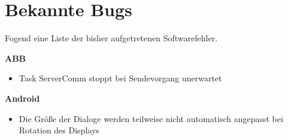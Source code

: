\section{Bekannte Bugs}
\label{sec:Bugs}
Fogend eine Liste der bisher aufgetretenen Softwarefehler.

\textbf{ABB}
\begin{itemize}
\item Task ServerComm stoppt bei Sendevorgang unerwartet
\end{itemize}

\textbf{Android}
\begin{itemize}
\item Die Größe der Dialoge werden teilweise nicht automatisch angepasst bei 
Rotation des Displays
\end{itemize}